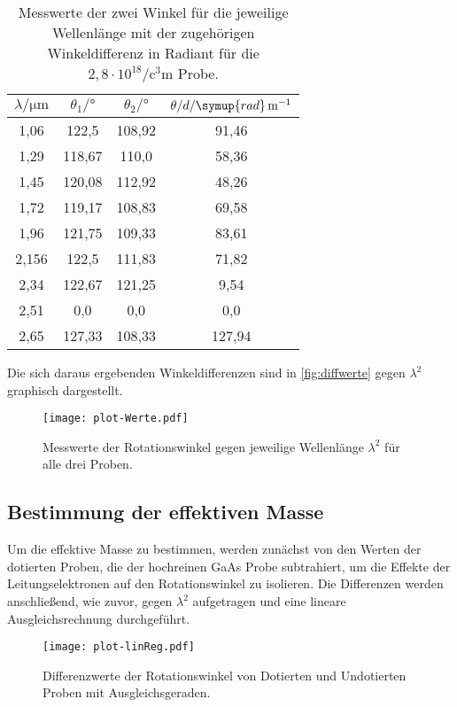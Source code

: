 \begin{table}[H]
  \centering
  \begin{tabular}{c c c c}
    $\lambda/\si{\micro\meter}$ & $\theta_{1}/\si{\degree}$ & $\theta_{2}/\si{\degree}$ & $\theta/d/\symup{rad}\, \si{m}^{-1}$\\
    \midrule
    1,06  &  122,5   &  108,92  &  91,46 \\
    1,29  &  118,67  &  110,0   &  58,36 \\
    1,45  &  120,08  &  112,92  &  48,26 \\
    1,72  &  119,17  &  108,83  &  69,58 \\
    1,96  &  121,75  &  109,33  &  83,61 \\
    2,156 &  122,5   &  111,83  &  71,82 \\
    2,34  &  122,67  &  121,25  &  9,54 \\
    2,51  &  0,0     &  0,0     &  0,0 \\
    2,65  &  127,33  &  108,33  &  127,94 \\
    \bottomrule
  \end{tabular}
  \caption{Messwerte der zwei Winkel für die jeweilige Wellenlänge mit der zugehörigen Winkeldifferenz in Radiant für die $2,8 \cdot 10^{18} \si{\per\cubic\centi\metre}$ Probe.}
  \label{tab:m1}
\end{table}
\noindent
Die sich daraus ergebenden Winkeldifferenzen sind in \autoref{fig:diffwerte} gegen $\lambda^2$ graphisch dargestellt.

\begin{figure}[H]
  \centering
  \texttt{[image: plot-Werte.pdf]}
  \caption{Messwerte der Rotationswinkel gegen jeweilige Wellenlänge $\lambda^2$ für alle drei Proben.}
  \label{fig:diffwerte}
\end{figure}


\subsection{Bestimmung der effektiven Masse}
\label{subsec:masse}

Um die effektive Masse zu bestimmen, werden zunächst von den Werten der dotierten Proben, die der hochreinen GaAs Probe subtrahiert, um die Effekte der Leitungselektronen
auf den Rotationswinkel zu isolieren. Die Differenzen werden anschließend, wie zuvor, gegen $\lambda^2$ aufgetragen und eine lineare Ausgleichsrechnung durchgeführt.

\begin{figure}[H]
  \centering
  \texttt{[image: plot-linReg.pdf]}
  \caption{Differenzwerte der Rotationswinkel von Dotierten und Undotierten Proben mit Ausgleichsgeraden.}
  \label{fig:diffwerte2}
\end{figure}

